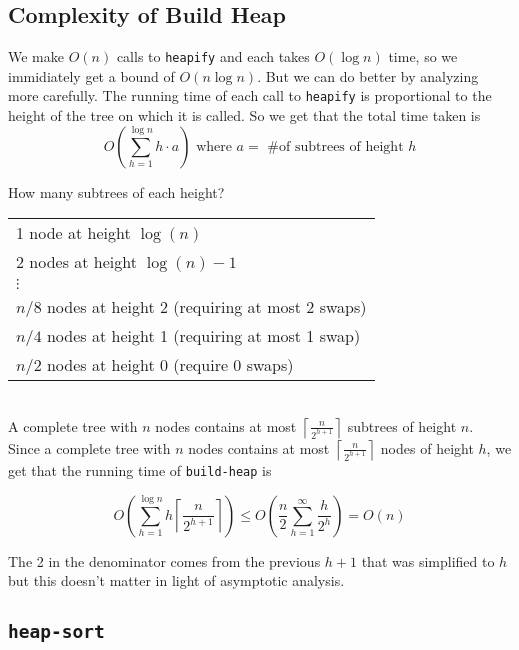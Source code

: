 \subsection*{Complexity of Build Heap}

\noindent We make $O(n)$ calls to \texttt{heapify} and each takes $O(\log n)$ time, so we immidiately get a bound of 
	$O(n \log n)$. But we can do better by analyzing more carefully. The running time of each call to \texttt{heapify}
	is proportional to the height of the tree on which it is called. So we get that the total time taken is 
$$O \left (\sum_{h=1}^{\log n} h \cdot a \right ) \textrm{ where } a= \textrm{ \# of subtrees of height }h$$

\noindent How many subtrees of each height? \\

\begin{tabular}{l}
	1 node at height $\log (n)$ \\
	2 nodes at height $\log (n) -1$ \\
	$\vdots$ \\
	$n/8$ nodes at height 2 (requiring at most 2 swaps)\\
	$n/4$ nodes at height 1 (requiring at most 1 swap)\\
	$n/2$ nodes at height 0 (require 0 swaps) \\
\end{tabular} \\

\noindent A complete tree with $n$ nodes contains at most
$\left \lceil \frac{n}{2^{h+1}} \right \rceil$
subtrees of height $n$.\\

\noindent Since a complete tree with $n$ nodes contains at most $\left \lceil \frac{n}{2^{h+1}} \right \rceil$ nodes of height $h$, we get that the running time of \texttt{build-heap} is


$$O \left (\sum_{h=1}^{\log n} h \left \lceil \frac{n}{2^{h+1}} \right \rceil \right ) \leq 
O \left (\frac{n}{2} \sum_{h=1}^{\infty} \frac{h}{2^h} \right )=
O(n)$$

\noindent The 2 in the denominator comes from the previous $h+1$ that was simplified to $h$ but this doesn't matter in light of asymptotic analysis.

\subsection*{\texttt{heap-sort}}

